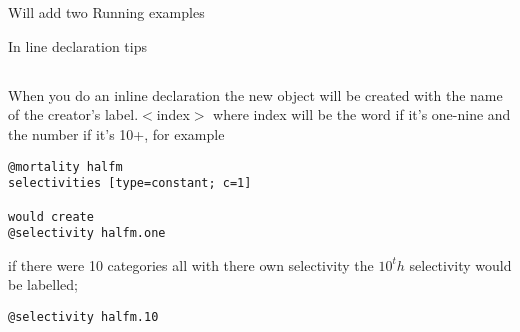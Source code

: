 
\section{\label{sec:examples}}
Will add two Running examples


In line declaration tips

\subsection{\label{sec:declare}}
When you do an inline declaration the new object will be created with the name of the creator's label.$<$index$>$
where index will be the word if it's one-nine and the number if it's 10+, for example
{\small{\begin{verbatim}
@mortality halfm
selectivities [type=constant; c=1]

would create
@selectivity halfm.one
		\end{verbatim}}}

if there were 10 categories all with there own selectivity the $10^th$ selectivity would be labelled;

{\small{\begin{verbatim}
@selectivity halfm.10
\end{verbatim}}}